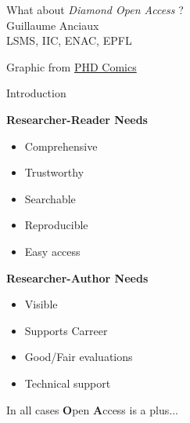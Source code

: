 \documentclass[10pt,compress,serif,aspectratio=169]{beamer}
\newcommand{\fig}[2]{\centering{\texttt{[image: \#2]}}}
\begin{document}
\begin{frame}[t]
  \begin{center}
  \vspace{1cm}
  {\huge What about \textit{Diamond Open Access} ?}\\
  \vspace{.5cm}
  {\Large Guillaume Anciaux}\\{LSMS, IIC, ENAC, EPFL}\\
  \end{center}
  \vspace{1cm}
  \fig{.45}{OA_acc_to_phd_comics}
  \begin{center}
    \small
    Graphic from \href{http://www.phdcomics.com/comics.php?f=1533}{PHD Comics}
  \end{center}
\end{frame}



\begin{frame}[t]{Introduction}

  \begin{minipage}{.48\textwidth}
    \textbf{Researcher-Reader Needs}
    \begin{itemize}
    \item Comprehensive
    \item Trustworthy
    \item Searchable
    \item Reproducible
    \item Easy access
    \end{itemize}
  \end{minipage}
  \pause
  \begin{minipage}{.48\textwidth}
    \textbf{Researcher-Author Needs}
    \begin{itemize}
    \item Visible
    \item Supports Carreer
    \item Good/Fair evaluations
    \item Technical support
    \end{itemize}
  \end{minipage}
  \pause
\vfill
  \begin{center}
    {\Large In all cases \textbf{O}pen \textbf{A}ccess is a plus...}
  \end{center}
\end{frame}

\end{document}
